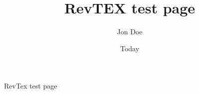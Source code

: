 \documentclass{article}
\begin{document}
\title{RevTEX test page}
\author{Jon Doe}
\date{Today}
\maketitle

RevTex test page

\nocite{*}
\printbibliography[title={Whole volume}]
\end{document}

